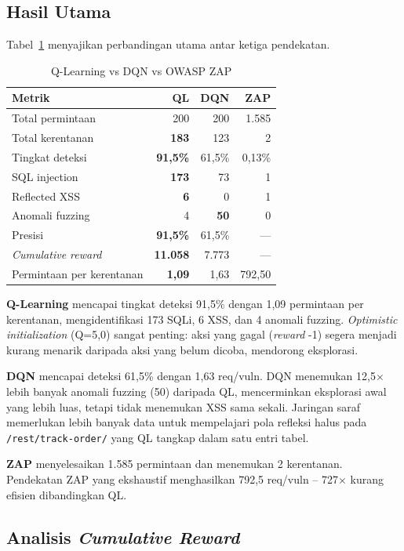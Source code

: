 \documentclass[a4paper,12pt]{article}
\begin{document}
\subsection{Hasil Utama}

Tabel~\ref{tab:main} menyajikan perbandingan utama antar ketiga pendekatan.

\begin{table}[H]
\caption{Q-Learning vs DQN vs OWASP ZAP}
\centering
\label{tab:main}
\small
\begin{tabular}{lrrr}
\toprule
Metrik & QL & DQN & ZAP \\
\midrule
Total permintaan & 200 & 200 & 1.585 \\
Total kerentanan & \textbf{183} & 123 & 2 \\
Tingkat deteksi & \textbf{91,5\%} & 61,5\% & 0,13\% \\
SQL injection & \textbf{173} & 73 & 1 \\
Reflected XSS & \textbf{6} & 0 & 1 \\
Anomali fuzzing & 4 & \textbf{50} & 0 \\
Presisi & \textbf{91,5\%} & 61,5\% & --- \\
\textit{Cumulative reward} & \textbf{11.058} & 7.773 & --- \\
Permintaan per kerentanan & \textbf{1,09} & 1,63 & 792,50 \\
\bottomrule
\end{tabular}
\end{table}

\textbf{Q-Learning} mencapai tingkat deteksi 91,5\% dengan 1,09 permintaan per kerentanan, mengidentifikasi 173 SQLi, 6 XSS, dan 4 anomali fuzzing. \textit{Optimistic initialization} (Q=5,0) sangat penting: aksi yang gagal (\textit{reward} -1) segera menjadi kurang menarik daripada aksi yang belum dicoba, mendorong eksplorasi.

\textbf{DQN} mencapai deteksi 61,5\% dengan 1,63 req/vuln. DQN menemukan 12,5$\times$ lebih banyak anomali fuzzing (50) daripada QL, mencerminkan eksplorasi awal yang lebih luas, tetapi tidak menemukan XSS sama sekali. Jaringan saraf memerlukan lebih banyak data untuk mempelajari pola refleksi halus pada \texttt{/rest/track-order/} yang QL tangkap dalam satu entri tabel.

\textbf{ZAP} menyelesaikan 1.585 permintaan dan menemukan 2 kerentanan. Pendekatan ZAP yang ekshaustif menghasilkan 792,5 req/vuln -- 727$\times$ kurang efisien dibandingkan QL.

\subsection{Analisis \textit{Cumulative Reward}}
\end{document}
